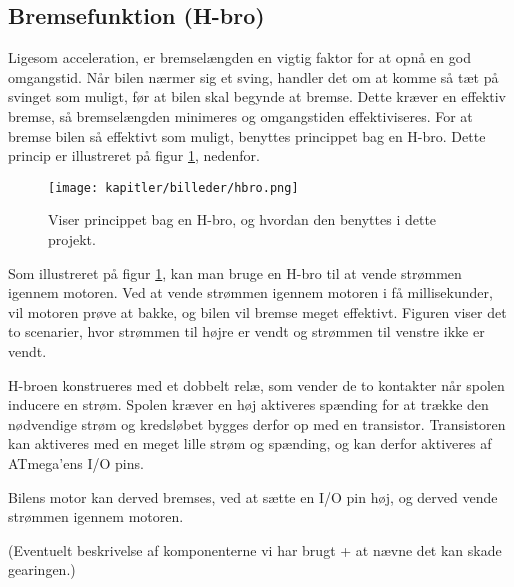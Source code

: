 
\subsection{Bremsefunktion (H-bro)}

Ligesom acceleration, er bremselængden en vigtig faktor for at opnå en god omgangstid.
Når bilen nærmer sig et sving, handler det om at komme så tæt på svinget som muligt, før at bilen
skal begynde at bremse. Dette kræver en effektiv bremse, så bremselængden minimeres og omgangstiden effektiviseres.
For at bremse bilen så effektivt som muligt, benyttes princippet bag en H-bro. Dette princip er illustreret
på figur \ref{fig:hbro}, nedenfor.

\begin{figure}[ht]
    \centering
    \texttt{[image: kapitler/billeder/hbro.png]}
    \caption{Viser princippet bag en H-bro, og hvordan den benyttes i dette projekt.}
    \label{fig:hbro}
\end{figure}

Som illustreret på figur \ref{fig:hbro}, kan man bruge en H-bro til at vende strømmen igennem motoren.
Ved at vende strømmen igennem motoren i få millisekunder, vil motoren prøve at bakke,
og bilen vil bremse meget effektivt. Figuren viser det to scenarier, hvor strømmen til højre er vendt
og strømmen til venstre ikke er vendt.

H-broen konstrueres med et dobbelt relæ, som vender de to kontakter når spolen inducere en strøm.
Spolen kræver en høj aktiveres spænding for at trække den nødvendige strøm
og kredsløbet bygges derfor op med en transistor.
Transistoren kan aktiveres med en meget lille strøm og spænding, og kan derfor aktiveres
af ATmega'ens I/O pins.

Bilens motor kan derved bremses, ved at sætte en I/O pin høj, og derved vende strømmen igennem motoren.

(Eventuelt beskrivelse af komponenterne vi har brugt + at nævne det kan skade gearingen.)
